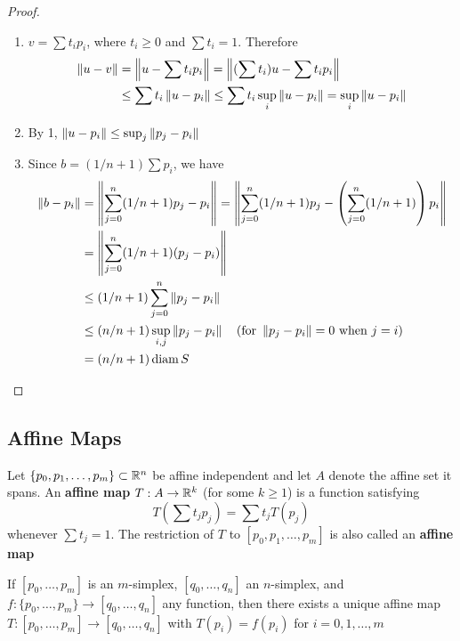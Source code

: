 \documentclass[11pt]{article}
\begin{document}
\begin{proof}
\begin{enumerate}
\item \(v=\sum t_ip_i\), where \(t_i\ge 0\) and \(\sum t_i=1\). Therefore
\begin{align*}
\left\lVert u-v\right\rVert&=\left\lVert u-\sum t_ip_i\right\rVert=\left\lVert(\sum t_i)u-\sum t_ip_i\right\rVert\\
&\le \sum t_i\left\lVert u-p_i\right\rVert\le \sum t_i\sup_i\left\lVert u-p_i\right\rVert=\sup_i\left\lVert u-p_i\right\rVert
\end{align*}
\item By 1, \(\left\lVert u-p_i\right\rVert\le\sup_j\left\lVert p_j-p_i\right\rVert\)
\item Since \(b=(1/n+1)\sum p_i\), we have
\begin{align*}
\left\lVert b-p_i\right\rVert&=\left\lVert\sum_{j=0}^n(1/n+1)p_j-p_i\right\rVert=\left\lVert\sum_{j=0}^n(1/n+1)p_j-
\left( \sum_{j=0}^n(1/n+1) \right)p_i\right\rVert\\
&=\left\lVert\sum_{j=0}^n(1/n+1)(p_j-p_i)\right\rVert\\
&\le (1/n+1)\sum_{j=0}^n\left\lVert p_j-p_i\right\rVert\\
&\le(n/n+1)\sup_{i,j}\left\lVert p_j-p_i\right\rVert\quad(\text{for }\left\lVert p_j-p_i\right\rVert=0\text{ when }j=i)\\
&=(n/n+1)\operatorname{diam} S
\end{align*}
\end{enumerate}
\end{proof}

\subsection{Affine Maps}
\label{sec:orgda2779f}

\begin{definition}[]
Let \(\{p_0,p_1,\dots,p_m\}\subset\mathbb{R}^n\) be affine independent and let \(A\) denote the affine set it spans. An
\textbf{affine map} \(T:A\to\mathbb{R}^k\) (for some \(k\ge 1\)) is a function satisfying
\begin{equation*}
T(\sum t_jp_j)=\sum t_jT(p_j)
\end{equation*}
whenever \(\sum t_j=1\). The restriction of \(T\) to \([p_0,p_1,\dots,p_m]\) is also called an \textbf{affine map}
\end{definition}

\begin{theorem}[]
If \([p_0,\dots,p_m]\) is an \(m\)-simplex, \([q_0,\dots,q_n]\) an \(n\)-simplex,
and \(f:\{p_0,\dots,p_m\}\to[q_0,\dots,q_n]\) any function, then there exists a unique affine
map \(T:[p_0,\dots,p_m]\to[q_0,\dots,q_n]\) with \(T(p_i)=f(p_i)\) for \(i=0,1,\dots,m\)
\end{theorem}
\end{document}
